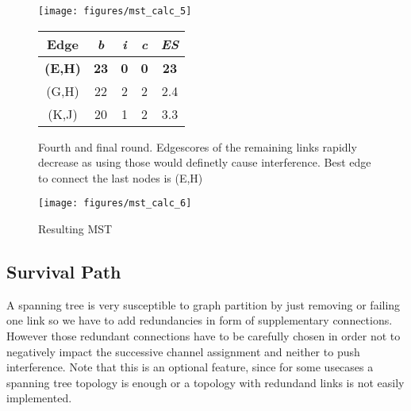       \begin{figure}[h!]
	\centering
	\begin{minipage}{0.5\textwidth}
	  \texttt{[image: figures/mst\_calc\_5]}
	\end{minipage}
	\begin{minipage}{0.49\textwidth}
	  \begin{tabular}{c||c|c|c||c}
	    Edge & \textit{b} & \textit{i} & \textit{c} & \textit{ES}\\ \hline\hline
	    \textbf{(E,H)} & \textbf{23} & \textbf{0} & \textbf{0} & \textbf{23} \\ \hline
	    (G,H) & 22 & 2 & 2 & 2.4 \\ \hline
	    (K,J) & 20 & 1 & 2 & 3.3 \\ \hline
	  \end{tabular}
	\end{minipage}
	\caption{Fourth and final round. Edgescores of the remaining links rapidly decrease as using those would definetly cause interference. 
	  Best edge to connect the last nodes is (E,H)}
	\label{fig:mst_calc_5}
      \end{figure} 
      \begin{figure}[h!]
	\begin{minipage}{0.5\textwidth}
	  \texttt{[image: figures/mst\_calc\_6]}
	\end{minipage}
	\caption{Resulting MST}
	\label{fig:mst_calc_6}
      \end{figure}  
     \newpage
      
    \subsection{Survival Path}
      A spanning tree is very susceptible to graph partition by just removing or failing one link so we have to add redundancies in form of supplementary connections.
      However those redundant connections have to be carefully chosen in order not to negatively impact the successive channel assignment and neither to push interference.
      Note that this is an optional feature, since for some usecases a spanning tree topology is enough or a topology with redundand links is not easily implemented.  
      
